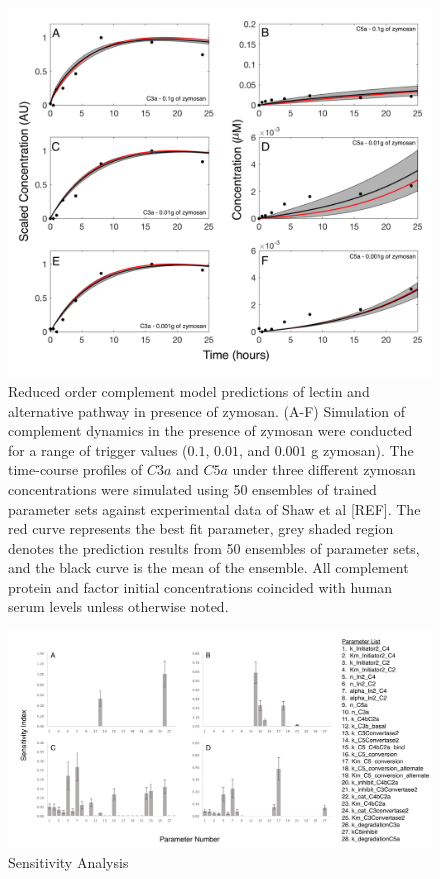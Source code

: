 \documentclass[12pt]{article}
\begin{document}
\begin{figure}[h]
\centering
\includegraphics[width=1.0\textwidth]{./figs/Figure3_Predictions_2.pdf}
\caption{Reduced order complement model predictions of lectin and alternative pathway in presence of zymosan. (A-F) Simulation of complement dynamics in the presence of zymosan were conducted for a range of trigger values ($0.1$, $0.01$, and $0.001$ g zymosan). The time-course profiles of $C3a$ and $C5a$ under three different zymosan concentrations were simulated using 50 ensembles of trained parameter sets against experimental data of Shaw et al [REF].  The red curve represents the best fit parameter, grey shaded region denotes the prediction results from 50 ensembles of parameter sets, and the black curve is the mean of the ensemble. All complement protein and factor initial concentrations coincided with human serum levels unless otherwise noted.}
\end{figure}

\begin{figure}[h]
\centering
\includegraphics[width=1.0\textwidth]{./figs/Figure4_Sensitivity_Analysis_v2.pdf}
\caption{Sensitivity Analysis}
\end{figure}
\end{document}
